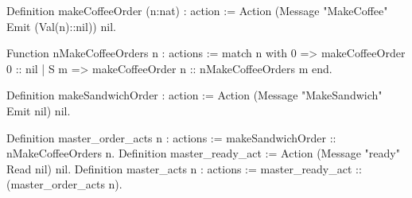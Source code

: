 Definition makeCoffeeOrder (n:nat) : action := 
  Action (Message "MakeCoffee" Emit (Val(n)::nil)) nil.

Function nMakeCoffeeOrders n : actions :=
  match n with
    0   => makeCoffeeOrder 0 :: nil
  | S m => makeCoffeeOrder n :: nMakeCoffeeOrders m
  end.

Definition makeSandwichOrder : action := 
  Action (Message "MakeSandwich" Emit nil) nil.

Definition master_order_acts n : actions  := 
     makeSandwichOrder :: nMakeCoffeeOrders n.
Definition master_ready_act := Action (Message "ready" Read nil) nil.
Definition master_acts n : actions := 
    master_ready_act :: (master_order_acts n).